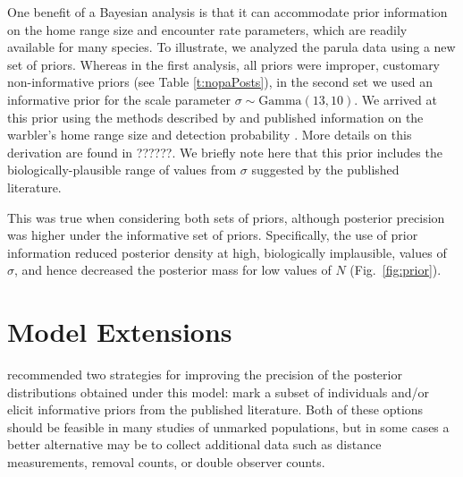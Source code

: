 


One benefit of a Bayesian analysis is that it can accommodate prior
information on the home range size and encounter rate parameters,
which are readily available for many
species. To illustrate, we analyzed the parula data using a new set of
priors. Whereas in the first analysis, all priors were
improper, customary non-informative priors (see Table \ref{t:nopaPosts}),
in the second set we used
an informative prior for the scale parameter $\sigma \sim
\mbox{Gamma}(13,10)$. We arrived at this prior using the methods
described by \citet{royle_etal:2011mee} and published
information on the warbler's home range size and detection probability
\citep{moldenhaer_regelski:1996,simons_etal:2009}. More details on this
derivation are found in ??????. We briefly note here that this prior
includes the biologically-plausible range of values from $\sigma$
suggested by the published literature.


This was true when considering
both sets of priors, although posterior precision was higher under the
informative set of priors. Specifically, the use of prior information
reduced posterior density at high, biologically implausible,
values of $\sigma$, and hence decreased the posterior mass for
low values of $N$ (Fig.~\ref{fig:prior}).




\section{Model Extensions}
\label{unmarked.ext}

\citet{chandler_royle:2012} recommended two strategies for improving
the precision of the posterior distributions obtained under this
model: mark a subset of individuals and/or elicit informative
priors from the published literature. Both of these options should be
feasible in many studies of unmarked populations, but in some cases a
better alternative may be to collect
additional data %
such as
distance measurements, %
removal counts, or %
double observer counts.

